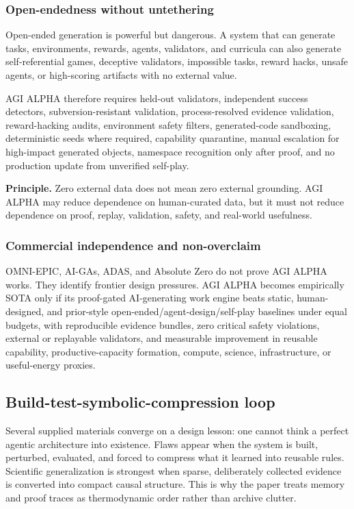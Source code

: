 \subsubsection{Open-endedness without
untethering}\label{open-endedness-without-untethering}

Open-ended generation is powerful but dangerous. A system that can
generate tasks, environments, rewards, agents, validators, and curricula
can also generate self-referential games, deceptive validators,
impossible tasks, reward hacks, unsafe agents, or high-scoring artifacts
with no external value.

AGI ALPHA therefore requires held-out validators, independent success
detectors, subversion-resistant validation, process-resolved evidence
validation, reward-hacking audits, environment safety filters,
generated-code sandboxing, deterministic seeds where required,
capability quarantine, manual escalation for high-impact generated
objects, namespace recognition only after proof, and no production
update from unverified self-play.

\textbf{Principle.} Zero external data does not mean zero external
grounding. AGI ALPHA may reduce dependence on human-curated data, but it
must not reduce dependence on proof, replay, validation, safety, and
real-world usefulness.

\subsubsection{Commercial independence and
non-overclaim}\label{commercial-independence-and-non-overclaim-1}

OMNI-EPIC, AI-GAs, ADAS, and Absolute Zero do not prove AGI ALPHA works.
They identify frontier design pressures. AGI ALPHA becomes empirically
SOTA only if its proof-gated AI-generating work engine beats static,
human-designed, and prior-style open-ended/agent-design/self-play
baselines under equal budgets, with reproducible evidence bundles, zero
critical safety violations, external or replayable validators, and
measurable improvement in reusable capability, productive-capacity
formation, compute, science, infrastructure, or useful-energy proxies.

\subsection{Build-test-symbolic-compression
loop}\label{build-test-symbolic-compression-loop}

Several supplied materials converge on a design lesson: one cannot think
a perfect agentic architecture into existence. Flaws appear when the
system is built, perturbed, evaluated, and forced to compress what it
learned into reusable rules. Scientific generalization is strongest when
sparse, deliberately collected evidence is converted into compact causal
structure. This is why the paper treats memory and proof traces as
thermodynamic order rather than archive clutter.

